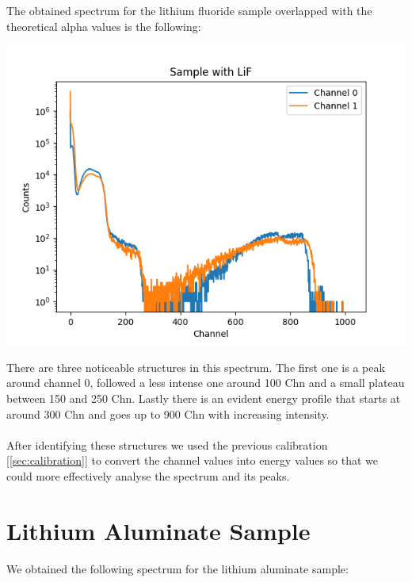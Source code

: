 \documentclass{article}
\begin{document}
\begin{multicols}{2}
The obtained spectrum for the lithium fluoride sample overlapped with the theoretical alpha values is the following:

\begin{center}
    \label{TT_21}
    \centering
    \includegraphics[scale = 0.6]{../images/SampleLiF.png}
\end{center}

There are three noticeable structures in this spectrum. 
The first one is a peak around channel 0, followed a less intense one around 100 Chn and a small plateau between 150 and 250 Chn. 
Lastly there is an evident energy profile that starts at around 300 Chn and goes up to 900 Chn with increasing intensity.

\paragraph*{}

After identifying these structures we used the previous calibration [\ref{sec:calibration}] to convert the channel values into energy values so that we could more effectively analyse the spectrum and its peaks.



\section{ Lithium Aluminate Sample}

We obtained the following spectrum for the lithium aluminate sample:


\end{multicols}
\end{document}

